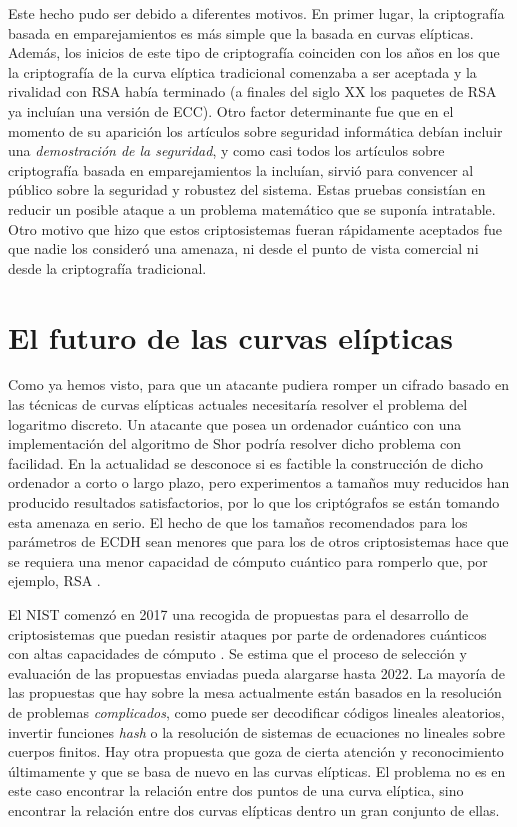\documentclass[
  a4paper,
  12pt,
  spanish,
]{scrartcl}
\begin{document}
Este hecho pudo ser debido a diferentes motivos. En primer lugar, la criptografía basada en emparejamientos es más simple que la basada en curvas elípticas. Además, los inicios de este tipo de criptografía coinciden con los años en los que la criptografía de la curva elíptica tradicional comenzaba a ser aceptada y la rivalidad con RSA había terminado (a finales del siglo XX los paquetes de RSA ya incluían una versión de ECC). Otro factor determinante fue que en el momento de su aparición los artículos sobre seguridad informática debían incluir una \textit{demostración de la seguridad}, y como casi todos los artículos sobre criptografía basada en emparejamientos la incluían, sirvió para convencer al público sobre la seguridad y robustez del sistema. Estas pruebas consistían en reducir un posible ataque a un problema matemático que se suponía intratable. Otro motivo que hizo que estos criptosistemas fueran rápidamente aceptados fue que nadie los consideró una amenaza, ni desde el punto de vista comercial ni desde la criptografía tradicional.

\section{El futuro de las curvas elípticas}
\label{sec:futuro}

Como ya hemos visto, para que un atacante pudiera romper un cifrado basado en las técnicas de curvas elípticas actuales necesitaría resolver el problema del logaritmo discreto.
Un atacante que posea un ordenador cuántico con una implementación del algoritmo de Shor \parencite{shor_polynomial-time_1999} podría resolver dicho problema con facilidad.
En la actualidad se desconoce si es factible la construcción de dicho ordenador a corto o largo plazo, pero experimentos a tamaños muy reducidos han producido resultados satisfactorios, por lo que los criptógrafos se están tomando esta amenaza en serio.
El hecho de que los tamaños recomendados para los parámetros de ECDH sean menores que para los de otros criptosistemas hace que se requiera una menor capacidad de cómputo cuántico para romperlo que, por ejemplo, RSA \parencite{beauregard_circuit_2003} \parencite{proos_shors_2004}.

El NIST comenzó en 2017 una recogida de propuestas para el desarrollo de criptosistemas que puedan resistir ataques por parte de ordenadores cuánticos con altas capacidades de cómputo \parencite{computer_security_division_call_2017}.
Se estima que el proceso de selección y evaluación de las propuestas enviadas pueda alargarse hasta 2022.
La mayoría de las propuestas que hay sobre la mesa actualmente están basados en la resolución de problemas \textit{complicados}, como puede ser decodificar códigos lineales aleatorios, invertir funciones \textit{hash} o la resolución de sistemas de ecuaciones no lineales sobre cuerpos finitos.
Hay otra propuesta que goza de cierta atención y reconocimiento últimamente y que se basa de nuevo en las curvas elípticas.
El problema no es en este caso encontrar la relación entre dos puntos de una curva elíptica, sino encontrar la relación entre dos curvas elípticas dentro un gran conjunto de ellas.
\end{document}
